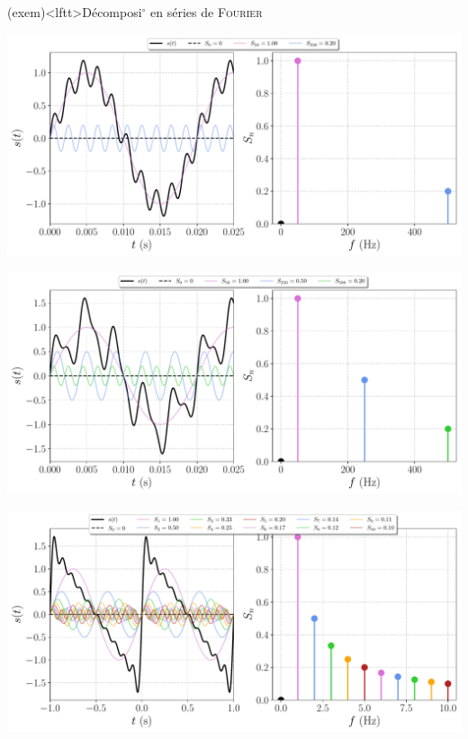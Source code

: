 \documentclass[../../main/main.tex]{subfiles}
\begin{document}
\begin{tcb}[breakable](exem)<lftt>{Décomposi$^\circ$ en séries de \textsc{Fourier}}
	\begin{minipage}{\linewidth}
		\centering
		\includegraphics[width=.85\linewidth]{fft_50_[1,10]_[1,0.2]}
		\vspace{-15pt}
	\end{minipage}

	\begin{minipage}{\linewidth}
		\centering
		\includegraphics[width=.85\linewidth]{fft_50_[1,5,10]_[1,0.5,0.2]}
		\vspace{-15pt}
		\label{fig:3some}
	\end{minipage}

	\begin{minipage}{\linewidth}
		\centering
		\includegraphics[width=.85\linewidth]{fft_add}
		\vspace{-15pt}
	\end{minipage}


\end{tcb}
\end{document}
